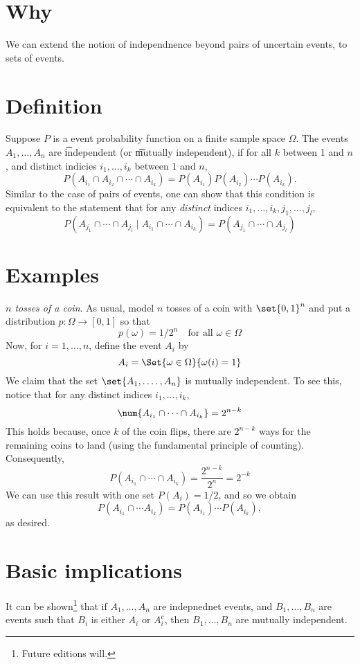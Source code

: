 
\section*{Why}

We can extend the notion of independnence beyond pairs of uncertain events, to sets of events.

\section*{Definition}

Suppose $P$ is a event probability function on a finite sample space $\Omega $.
The events $A_1, \dots , A_n$ are \t{independent} (or \t{mutually independent}), if for all $k$ between 1 and $n$, and distinct indicies $i_1, \dots , i_k$ between $1$ and $n$,
\[
P(A_{i_1} \cap  A_{i_2} \cap  \cdots \cap  A_{i_k})
=
P(A_{i_1}) P(A_{i_2}) \cdots P(A_{i_k}) .
\]
Similar to the case of pairs of events, one can show that this condition is equivalent to the statement that for any \textit{distinct} indices $i_1, \dots , i_k, j_1, \dots , j_l$,
\[
P(A_{j_1} \cap  \cdots \cap  A_{j_l} \mid  A_{i_1} \cap  \cdots \cap  A_{i_k}) = P(A_{j_1} \cap  \cdots \cap  A_{j_l})
\]

\section*{Examples}

\textit{$n$ tosses of a coin}.
As usual, model $n$ tosses of a coin with $\set{0,1}^n$ and put a distribution $p: \Omega  \to [0,1]$ so that
\[
p(\omega ) = 1/2^n \quad \text{for all } \omega  \in \Omega
\]
Now, for $i = 1, \dots , n$, define the event $A_i$ by
\[
A_i = \Set{\omega  \in \Omega }{\omega (i) = 1}
\]
We claim that the set $\set{A_1,. \dots , A_n}$ is mutually independent.
To see this, notice that for any distinct indices $i_1, \dots , i_k$,
\[
\num{A_{i_1} \cap  \cdots \cap  A_{i_k}} = 2^{n-k}
\]
This holds because, once $k$ of the coin flips, there are $2^{n-k}$ ways for the remaining coins to land (using the fundamental principle of counting).
Consequently,
\[
P(A_{i_1} \cap  \cdots \cap  A_{i_k}) = \frac{2^{n-k}}{2^n} = 2^{-k}
\]
We can use this result with one set $P(A_i) = 1/2$, and so we obtain
\[
P(A_{i_1} \cap  \cdots A_{i_k}) = P(A_{i_1}) \cdots P(A_{i_k}),
\]
as desired.

\section*{Basic implications}

It can be shown\footnote{Future editions will.}
that if $A_1, \dots , A_n$ are indepnednet events, and $B_1, \dots , B_n$ are events such that $B_i$ is either $A_i$ or $A_i^c$, then $B_1, \dots , B_n$ are mutually independent.

\blankpage